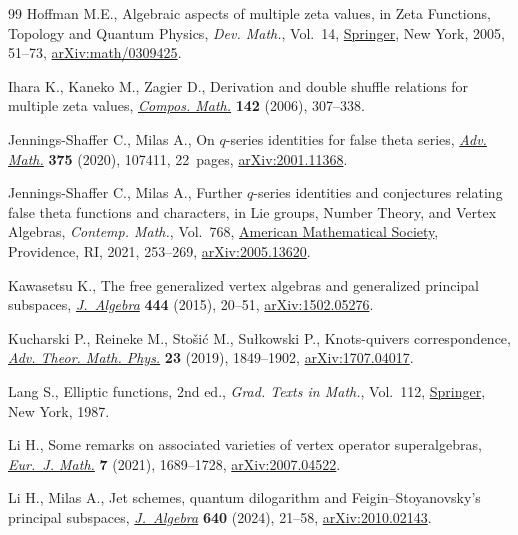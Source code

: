 \documentclass[10pt,a4paper]{amsart}
\numberwithin{equation}{section}
\theoremstyle{definition}
\begin{document}
\begin{thebibliography}{99}
Hoffman M.E., Algebraic aspects of multiple zeta values, in Zeta Functions,
 Topology and Quantum Physics, \textit{Dev. Math.}, Vol.~14,
 \href{https://doi.org/10.1007/0-387-24981-8_4}{Springer}, New York, 2005,
 51--73, \href{https://arxiv.org/abs/math/0309425}{arXiv:math/0309425}.

Ihara K., Kaneko M., Zagier D., Derivation and double shuffle relations for
 multiple zeta values,
 \href{https://doi.org/10.1112/S0010437X0500182X}{\textit{Compos. Math.}}
 \textbf{142} (2006), 307--338.

Jennings-Shaffer C., Milas A., On {$q$}-series identities for false theta
 series, \href{https://doi.org/10.1016/j.aim.2020.107411}{\textit{Adv. Math.}}
 \textbf{375} (2020), 107411, 22~pages,
 \href{https://arxiv.org/abs/2001.11368}{arXiv:2001.11368}.

Jennings-Shaffer C., Milas A., Further {$q$}-series identities and conjectures
 relating false theta functions and characters, in Lie groups, Number Theory,
 and Vertex Algebras, \textit{Contemp. Math.}, Vol.~768,
 \href{https://doi.org/10.1090/conm/768/15467}{American Mathematical Society},
 Providence, RI, 2021, 253--269,
 \href{https://arxiv.org/abs/2005.13620}{arXiv:2005.13620}.

Kawasetsu K., The free generalized vertex algebras and generalized principal
 subspaces,
 \href{https://doi.org/10.1016/j.jalgebra.2015.07.014}{\textit{J.~Algebra}}
 \textbf{444} (2015), 20--51,
 \href{https://arxiv.org/abs/1502.05276}{arXiv:1502.05276}.

Kucharski P., Reineke M., Sto\v{s}i\'{c} M., Su{\l}kowski P., Knots-quivers
 correspondence,
 \href{https://doi.org/10.4310/atmp.2019.v23.n7.a4}{\textit{Adv. Theor. Math.
 Phys.}} \textbf{23} (2019), 1849--1902,
 \href{https://arxiv.org/abs/1707.04017}{arXiv:1707.04017}.

Lang S., Elliptic functions, 2nd ed., \textit{Grad. Texts in Math.}, Vol.~112,
 \href{https://doi.org/10.1007/978-1-4612-4752-4}{Springer}, New York, 1987.

Li H., Some remarks on associated varieties of vertex operator superalgebras,
 \href{https://doi.org/10.1007/s40879-021-00477-6}{\textit{Eur.~J. Math.}}
 \textbf{7} (2021), 1689--1728,
 \href{https://arxiv.org/abs/2007.04522}{arXiv:2007.04522}.

Li H., Milas A., Jet schemes, quantum dilogarithm and {F}eigin--{S}toyanovsky's
 principal subspaces,
 \href{https://doi.org/10.1016/j.jalgebra.2023.10.033}{\textit{J.~Algebra}}
 \textbf{640} (2024), 21--58,
 \href{https://arxiv.org/abs/2010.02143}{arXiv:2010.02143}.


\end{thebibliography}
\end{document}
